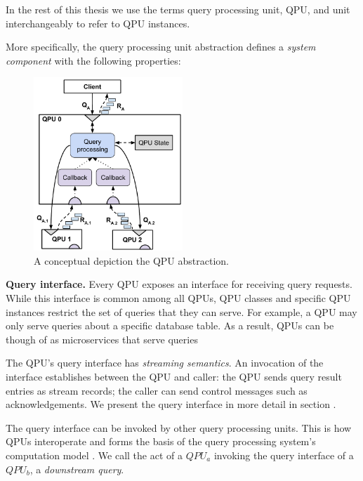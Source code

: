 In the rest of this thesis we use the terms query processing unit, QPU, and unit interchangeably to refer to QPU instances.

\bigskip

More specifically, the query processing unit abstraction defines a \textit{system component} with the following properties:

\begin{figure}[t]
  \centering
    \includegraphics[width=0.5\textwidth]{./figures/design_pattern/qpu_abstraction.pdf}
  \caption{A conceptual depiction the QPU abstraction.}
  \label{fig:qpu_abstraction}
\end{figure}

\medskip

\noindent
\textbf{Query interface.}
Every QPU exposes an interface for receiving query requests.
While this interface is common among all QPUs, QPU classes and specific QPU instances restrict the set of queries
that they can serve.
For example, a QPU may only serve queries about a specific database table.
As a result, QPUs can be though of as microservices that serve queries

The QPU's query interface has \textit{streaming semantics}.
An invocation of the interface establishes between the QPU and caller:
the QPU sends query result entries as stream records; the caller can send control messages such as acknowledgements.
We present the query interface in more detail in section .

The query interface can be invoked by other query processing units.
This is how QPUs interoperate and forms the basis of the query processing system's computation model .
We call the act of a $QPU_a$ invoking the query interface of a $QPU_b$, a \textit{downstream query}.

